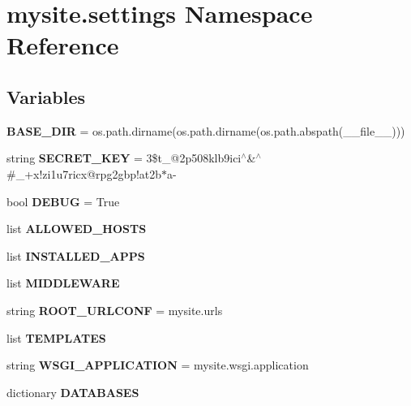 \hypertarget{namespacemysite_1_1settings}{}\section{mysite.\+settings Namespace Reference}
\label{namespacemysite_1_1settings}
\subsection*{Variables}
\begin{DoxyCompactItemize}
\item 
\mbox{\label{namespacemysite_1_1settings_a88bb6a8924ccca687362017da9110d54}} 
{\bfseries B\+A\+S\+E\+\_\+\+D\+IR} = os.\+path.\+dirname(os.\+path.\+dirname(os.\+path.\+abspath(\+\_\+\+\_\+file\+\_\+\+\_\+)))
\item 
\mbox{\label{namespacemysite_1_1settings_ab2aed82d2734b39d5387b22b7a953de5}} 
string {\bfseries S\+E\+C\+R\+E\+T\+\_\+\+K\+EY} = \textquotesingle{}3\$t\+\_\+@2p508klb9ici$^\wedge$\&$^\wedge$\#\+\_\++x!zi1u7ricx@rpg2gbp!at2b$\ast$a-\/\textquotesingle{}
\item 
\mbox{\label{namespacemysite_1_1settings_af3cd9446472cd1e91fa265ae8440b2a1}} 
bool {\bfseries D\+E\+B\+UG} = True
\item 
list {\bfseries A\+L\+L\+O\+W\+E\+D\+\_\+\+H\+O\+S\+TS}
\item 
list {\bfseries I\+N\+S\+T\+A\+L\+L\+E\+D\+\_\+\+A\+P\+PS}
\item 
list {\bfseries M\+I\+D\+D\+L\+E\+W\+A\+RE}
\item 
\mbox{\label{namespacemysite_1_1settings_ab0a7fa8cdaaccbf5bf874db67cbe507a}} 
string {\bfseries R\+O\+O\+T\+\_\+\+U\+R\+L\+C\+O\+NF} = \textquotesingle{}mysite.\+urls\textquotesingle{}
\item 
list {\bfseries T\+E\+M\+P\+L\+A\+T\+ES}
\item 
\mbox{\label{namespacemysite_1_1settings_a7e476bde6438ad8065a7d9f5b4a759ba}} 
string {\bfseries W\+S\+G\+I\+\_\+\+A\+P\+P\+L\+I\+C\+A\+T\+I\+ON} = \textquotesingle{}mysite.\+wsgi.\+application\textquotesingle{}
\item 
dictionary {\bfseries D\+A\+T\+A\+B\+A\+S\+ES}

\end{DoxyCompactItemize}
